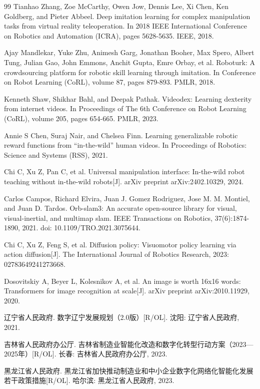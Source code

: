 \documentclass[zihao=-4]{ctexart}
\begin{document}
\begin{thebibliography}{99}
 Tianhao Zhang, Zoe McCarthy, Owen Jow, Dennis Lee, Xi Chen, Ken Goldberg, and Pieter Abbeel. Deep imitation learning for complex manipulation tasks from virtual reality teleoperation. In 2018 IEEE International Conference on Robotics and Automation (ICRA), pages 5628-5635. IEEE, 2018.

 Ajay Mandlekar, Yuke Zhu, Animesh Garg, Jonathan Booher, Max Spero, Albert Tung, Julian Gao, John Emmons, Anchit Gupta, Emre Orbay, et al. Roboturk: A crowdsourcing platform for robotic skill learning through imitation. In Conference on Robot Learning (CoRL), volume 87, pages 879-893. PMLR, 2018.

 Kenneth Shaw, Shikhar Bahl, and Deepak Pathak. Videodex: Learning dexterity from internet videos. In Proceedings of The 6th Conference on Robot Learning (CoRL), volume 205, pages 654-665. PMLR, 2023.

 Annie S Chen, Suraj Nair, and Chelsea Finn. Learning generalizable robotic reward functions from “in-the-wild” human videos. In Proceedings of Robotics: Science and Systems (RSS), 2021.

 Chi C, Xu Z, Pan C, et al. Universal manipulation interface: In-the-wild robot teaching without in-the-wild robots[J]. arXiv preprint arXiv:2402.10329, 2024.

 Carlos Campos, Richard Elvira, Juan J. Gomez Rodriguez, Jose M. M. Montiel, and Juan D. Tardos. Orb-slam3: An accurate open-source library for visual, visual-inertial, and multimap slam. IEEE Transactions on Robotics, 37(6):1874-1890, 2021. doi: 10.1109/TRO.2021.3075644.

 Chi C, Xu Z, Feng S, et al. Diffusion policy: Visuomotor policy learning via action diffusion[J]. The International Journal of Robotics Research, 2023: 02783649241273668.

 Dosovitskiy A, Beyer L, Kolesnikov A, et al. An image is worth 16x16 words: Transformers for image recognition at scale[J]. arXiv preprint arXiv:2010.11929, 2020.


 辽宁省人民政府. 数字辽宁发展规划（2.0版）[R/OL]. 沈阳: 辽宁省人民政府, 2021.

 吉林省人民政府办公厅. 吉林省制造业智能化改造和数字化转型行动方案（2023—2025年）[R/OL]. 长春: 吉林省人民政府办公厅, 2023.

 黑龙江省人民政府. 黑龙江省加快推动制造业和中小企业数字化网络化智能化发展若干政策措施[R/OL]. 哈尔滨: 黑龙江省人民政府, 2023.

\end{thebibliography}
\end{document}
